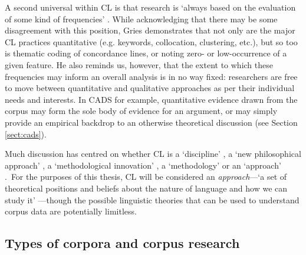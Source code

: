 A second universal within \gls{CL} is that research is `always based on the evaluation of some kind of frequencies' \cite[p.~1226]{gries_what_2009}. While acknowledging that there may be some disagreement with this position, Gries demonstrates that not only are the major \gls{CL} practices quantitative (e.g. keywords, collocation, clustering, etc.), but so too is thematic coding of concordance lines, or noting zero- or low\hyp{}occurrence of a given feature. He also reminds us, however, that the extent to which these frequencies may inform an overall analysis is in no way fixed: researchers are free to move between quantitative and qualitative approaches as per their individual needs and interests. In \gls{CADS} for example, quantitative evidence drawn from the corpus may form the sole body of evidence for an argument, or may simply provide an empirical backdrop to an otherwise theoretical discussion (see Section \ref{sect:cads}).

Much discussion has centred on whether \gls{CL} is a `discipline' \cite{tognini-bonelli_corpus_2001}, a `new philosophical approach' \cite{leech_corpora_1992}, a `methodological innovation' \cite{larsen-freeman_techniques_2000, lee_corpora_2007}, a `methodology' \cite{gries_what_2009,mcenery_corpus-based_2006} or an `approach' \cite{lee_corpora_2007,stubbs_language_2004}.~For the purposes of this thesis, \gls{CL} will be considered an \emph{approach}---`a set of theoretical positions and beliefs about the nature of language and how we can study it' \cite[p.~87]{lee_corpora_2007}---though the possible linguistic theories that can be used to understand \gls{corpus} data are potentially limitless.

\subsection{Types of corpora and corpus research}

